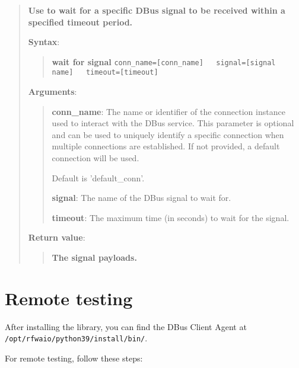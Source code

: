 \begin{quote}
\textbf{Use to wait for a specific DBus signal to be received within a specified timeout period.}

\textbf{Syntax}:
\begin{quote}
\textbf{wait for signal}
\texttt{conn\_name={[}conn\_name{]}\ \ \ signal={[}signal name{]}\ \ \ timeout={[}timeout{]}}
\end{quote}

\textbf{Arguments}:

\begin{quote}
\textbf{conn\_name}: The name or identifier of the connection instance used to interact with the DBus service.
  This parameter is optional and can be used to uniquely identify a specific connection
  when multiple connections are established. If not provided, a default connection will be used.
  
  Default is 'default\_conn'.
  
\vspace{\baselineskip}

\textbf{signal}: The name of the DBus signal to wait for.

\vspace{\baselineskip}

\textbf{timeout}: The maximum time (in seconds) to wait for the signal.
\end{quote}

\textbf{Return value}:

\begin{quote}
\textbf{The signal payloads.}
\end{quote}
\end{quote}

\hypertarget{remote-testing}{%
\section{Remote testing}\label{remote-testing}}

After installing the library, you can find the DBus Client Agent at \texttt{/opt/rfwaio/python39/install/bin/}.

For remote testing, follow these steps:


